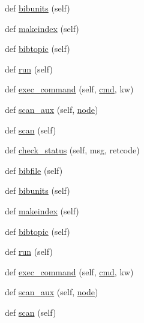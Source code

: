 \begin{DoxyCompactItemize}
\item 
def \hyperlink{classwaflib_1_1_tools_1_1tex_1_1tex_adc9975ca42cc99bdfed2453d0501deb7}{bibunits} (self)
\item 
def \hyperlink{classwaflib_1_1_tools_1_1tex_1_1tex_a037e014ad6faffb9d86bce5a13038776}{makeindex} (self)
\item 
def \hyperlink{classwaflib_1_1_tools_1_1tex_1_1tex_a91f60e48f7933bde8c62a1108c408f84}{bibtopic} (self)
\item 
def \hyperlink{classwaflib_1_1_tools_1_1tex_1_1tex_a9ca231d8975e3c1d5d3c9e455f31f892}{run} (self)
\item 
def \hyperlink{classwaflib_1_1_tools_1_1tex_1_1tex_af3bd4c7abea22374fe7cb435022880cd}{exec\+\_\+command} (self, \hyperlink{sndfile__play_8m_adfc5ba7e22f5e4a6221c12a70503bef3}{cmd}, kw)
\item 
def \hyperlink{classwaflib_1_1_tools_1_1tex_1_1tex_abd3866cf63c379f3bdd3e1568f32182a}{scan\+\_\+aux} (self, \hyperlink{structnode}{node})
\item 
def \hyperlink{classwaflib_1_1_tools_1_1tex_1_1tex_a9a1611c5caf6c5ef3bf0efbcd7cdb0b4}{scan} (self)
\item 
def \hyperlink{classwaflib_1_1_tools_1_1tex_1_1tex_ac5e3e5ed9bae28652ceec355e87c041b}{check\+\_\+status} (self, msg, retcode)
\item 
def \hyperlink{classwaflib_1_1_tools_1_1tex_1_1tex_a84f06095e6adb078c76849aaad9caaa7}{bibfile} (self)
\item 
def \hyperlink{classwaflib_1_1_tools_1_1tex_1_1tex_adc9975ca42cc99bdfed2453d0501deb7}{bibunits} (self)
\item 
def \hyperlink{classwaflib_1_1_tools_1_1tex_1_1tex_a037e014ad6faffb9d86bce5a13038776}{makeindex} (self)
\item 
def \hyperlink{classwaflib_1_1_tools_1_1tex_1_1tex_a91f60e48f7933bde8c62a1108c408f84}{bibtopic} (self)
\item 
def \hyperlink{classwaflib_1_1_tools_1_1tex_1_1tex_a9ca231d8975e3c1d5d3c9e455f31f892}{run} (self)
\item 
def \hyperlink{classwaflib_1_1_tools_1_1tex_1_1tex_af3bd4c7abea22374fe7cb435022880cd}{exec\+\_\+command} (self, \hyperlink{sndfile__play_8m_adfc5ba7e22f5e4a6221c12a70503bef3}{cmd}, kw)
\item 
def \hyperlink{classwaflib_1_1_tools_1_1tex_1_1tex_abd3866cf63c379f3bdd3e1568f32182a}{scan\+\_\+aux} (self, \hyperlink{structnode}{node})
\item 
def \hyperlink{classwaflib_1_1_tools_1_1tex_1_1tex_a9a1611c5caf6c5ef3bf0efbcd7cdb0b4}{scan} (self)

\end{DoxyCompactItemize}

